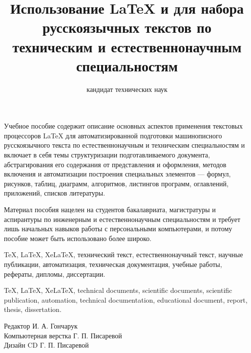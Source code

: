 \documentclass[workbook]{fefudoc}
\author{кандидат технических наук}{доцент департамента электроники, телекоммуникаций и приборостроения Политехнического института}{Чусов Андрей Александрович},
\institute{Политехнический институт}
\title{Использование \LaTeX{} и \XeLaTeX{} для набора русскоязычных текстов по техническим и естественнонаучным специальностям}
\begin{document}
\titlepage{}

\begin{copyrightpage}
	\begin{reviewers}
	\end{reviewers}
	\begin{annotation}
	Учебное пособие содержит описание основных аспектов применения текстовых процессоров \LaTeX{} для автоматизированной подготовки машинописного русскоязычного текста по естественнонаучным и техническим специальностям и включает в себя темы структуризации подготавливаемого документа, абстрагирования его содержания от представления и оформления, методов включения и автоматизации построения специальных элементов --- формул, рисунков, таблиц, диаграмм, алгоритмов, листингов программ, оглавлений, приложений, списков литературы.

	Материал пособия нацелен на студентов бакалавриата, магистратуры и аспирантуры по инженерным и естественнонаучным специальностям и требует лишь начальных навыков работы с персональными компьютерами, и потому пособие может быть использовано более широко.
	\end{annotation}
	\begin{keywords}[ru]
		TeX, LaTeX, XeLaTeX, технический текст, естественнонаучный текст, научные публикации, автоматизация, техническая документация, учебные работы, рефераты, дипломы, диссертации.
	\end{keywords}
	\begin{keywords}[en]
		TeX, LaTeX, XeLaTeX, technical documents, scientific documents, scientific publication, automation, technical documentation, educational document, report, thesis, dissertation.
	\end{keywords}
	\begin{publisherblock}
		\begin{publisherinfo}
			Редактор И. А. Гончарук \\
			Компьютерная верстка Г. П. Писаревой \\
			Дизайн CD Г. П. Писаревой \\
		\end{publisherinfo}


\end{publisherblock}
\end{copyrightpage}
\end{document}
